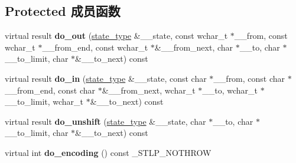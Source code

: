 \subsection*{Protected 成员函数}
\begin{DoxyCompactItemize}
\item 
\mbox{\label{classcodecvt_3_01wchar__t_00_01char_00_01mbstate__t_01_4_aefb0e5a0755aafa65fc4294049af4457}} 
virtual result {\bfseries do\+\_\+out} (\hyperlink{struct____mbstate__t}{state\+\_\+type} \&\+\_\+\+\_\+state, const wchar\+\_\+t $\ast$\+\_\+\+\_\+from, const wchar\+\_\+t $\ast$\+\_\+\+\_\+from\+\_\+end, const wchar\+\_\+t $\ast$\&\+\_\+\+\_\+from\+\_\+next, char $\ast$\+\_\+\+\_\+to, char $\ast$\+\_\+\+\_\+to\+\_\+limit, char $\ast$\&\+\_\+\+\_\+to\+\_\+next) const
\item 
\mbox{\label{classcodecvt_3_01wchar__t_00_01char_00_01mbstate__t_01_4_ad6b028f663a9181fcca2eb3808382c06}} 
virtual result {\bfseries do\+\_\+in} (\hyperlink{struct____mbstate__t}{state\+\_\+type} \&\+\_\+\+\_\+state, const char $\ast$\+\_\+\+\_\+from, const char $\ast$\+\_\+\+\_\+from\+\_\+end, const char $\ast$\&\+\_\+\+\_\+from\+\_\+next, wchar\+\_\+t $\ast$\+\_\+\+\_\+to, wchar\+\_\+t $\ast$\+\_\+\+\_\+to\+\_\+limit, wchar\+\_\+t $\ast$\&\+\_\+\+\_\+to\+\_\+next) const
\item 
\mbox{\label{classcodecvt_3_01wchar__t_00_01char_00_01mbstate__t_01_4_aa60ad33708cb432442ee7fd711388f55}} 
virtual result {\bfseries do\+\_\+unshift} (\hyperlink{struct____mbstate__t}{state\+\_\+type} \&\+\_\+\+\_\+state, char $\ast$\+\_\+\+\_\+to, char $\ast$\+\_\+\+\_\+to\+\_\+limit, char $\ast$\&\+\_\+\+\_\+to\+\_\+next) const
\item 
\mbox{\label{classcodecvt_3_01wchar__t_00_01char_00_01mbstate__t_01_4_a080c2101b30d1a59ea02fec630d9923b}} 
virtual int {\bfseries do\+\_\+encoding} () const \+\_\+\+S\+T\+L\+P\+\_\+\+N\+O\+T\+H\+R\+OW
\item 
\mbox{\label{classcodecvt_3_01wchar__t_00_01char_00_01mbstate__t_01_4_a3b6aaf1aa7cf65b9785e1bb70ffea9ca}} 

\end{DoxyCompactItemize}
